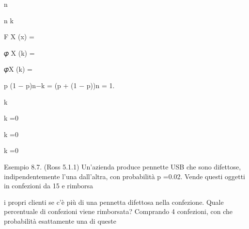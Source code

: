 \documentclass[a4paper,portrait,12pt]{article}
\begin{document}
\begin{flushleft}
n
\end{flushleft}


\begin{flushleft}
n k
\end{flushleft}


\begin{flushleft}
F X (x) =
\end{flushleft}


\begin{flushleft}
𝜑 X (k) =
\end{flushleft}


\begin{flushleft}
𝜑X (k) =
\end{flushleft}


\begin{flushleft}
p (1 $-$ p)n$-$k = (p + (1 $-$ p))n = 1.
\end{flushleft}


\begin{flushleft}
k
\end{flushleft}


\begin{flushleft}
k =0
\end{flushleft}





\begin{flushleft}
k =0
\end{flushleft}





\begin{flushleft}
k =0
\end{flushleft}





\begin{flushleft}
Esempio 8.7. (Ross 5.1.1) Un'azienda produce pennette USB che sono difettose, indipendentemente l'una dall'altra, con probabilit\`{a} p =0.02. Vende questi oggetti in confezioni da 15 e rimborsa
\end{flushleft}


\begin{flushleft}
i propri clienti se c'\`{e} più di una pennetta difettosa nella confezione. Quale percentuale di confezioni viene rimborsata? Comprando 4 confezioni, con che probabilit\`{a} esattamente una di queste
\end{flushleft}
\end{document}

